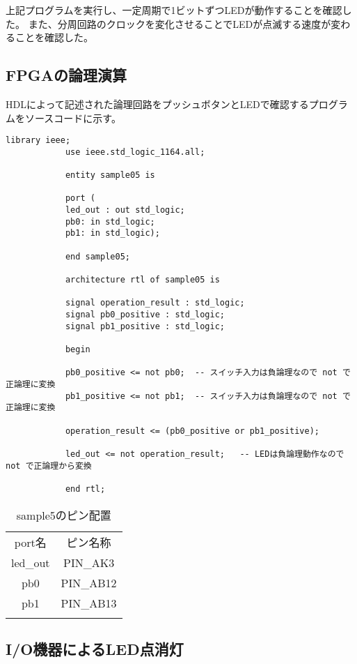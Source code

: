 \documentclass{ltjsarticle}
\begin{document}
		上記プログラムを実行し、一定周期で1ビットずつLEDが動作することを確認した。
		また、分周回路のクロックを変化させることでLEDが点滅する速度が変わることを確認した。

	\subsection{FPGAの論理演算}
		HDLによって記述された論理回路をプッシュボタンとLEDで確認するプログラムをソースコードに示す。
		\begin{lstlisting}[caption=sample5, label=code:sample5]
			library ieee;
			use ieee.std_logic_1164.all;

			entity sample05 is

			port (
			led_out : out std_logic;
			pb0: in std_logic;
			pb1: in std_logic);

			end sample05;

			architecture rtl of sample05 is

			signal operation_result : std_logic;
			signal pb0_positive : std_logic;
			signal pb1_positive : std_logic;

			begin

			pb0_positive <= not pb0;  -- スイッチ入力は負論理なので not で正論理に変換
			pb1_positive <= not pb1;  -- スイッチ入力は負論理なので not で正論理に変換

			operation_result <= (pb0_positive or pb1_positive);

			led_out <= not operation_result;   -- LEDは負論理動作なので not で正論理から変換

			end rtl;
		\end{lstlisting}

		\begin{table}[H]
		\begin{center}
		\caption{sample5のピン配置}
		\label{tab:sample5}
		\begin{tabular}{cc} \toprule
			port名&ピン名称\\
			led\_out&PIN\_AK3\\
			pb0&PIN\_AB12\\
			pb1&PIN\_AB13\\
			\botoomrule
		\end{tabular}
		\end{center}
		\end{table}

	\subsection{I/O機器によるLED点消灯}
\end{document}
